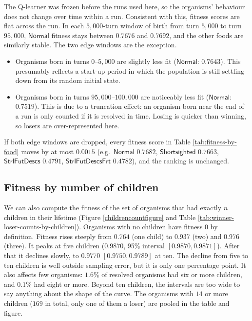 \documentclass{article}
\begin{document}
The Q-learner was frozen before the runs used here, so the organisms' behaviour
does not change over time within a run. Consistent with this, fitness scores are
flat across the run. In each $5{,}000$-turn window of birth from turn $5{,}000$ to
turn $95{,}000$, $\mathsf{Normal}$ fitness stays between $0.7676$ and $0.7692$,
and the other foods are similarly stable. The two edge windows are the
exception.
\begin{itemize}
    \item Organisms born in turns $0$--$5{,}000$ are slightly less fit
        ($\mathsf{Normal}$: $0.7643$). This presumably reflects a start-up period in
        which the population is still settling down from its random initial
        state.
    \item Organisms born in turns $95{,}000$--$100{,}000$ are noticeably less
        fit ($\mathsf{Normal}$: $0.7519$). This is due to a truncation effect:
        an organism born near the end of a run is only counted if it
        is resolved in time. Losing is quicker than winning, so losers are
        over-represented here.
\end{itemize}
If both edge windows are dropped, every fitness score in
Table \ref{tab:fitness-by-food} moves by at most $0.0015$
(e.g.\ $\mathsf{Normal}$ $0.7682$, $\mathsf{Shortsighted}$ $0.7663$,
$\mathsf{StrlFutDescs}$ $0.4791$, $\mathsf{StrlFutDescsFrt}$ $0.4782$), and the
ranking is unchanged.

\subsection{Fitness by number of children}

We can also compute the fitness of the set of organisms that had exactly $n$
children in their lifetime (Figure \ref{childrencountfigure} and
Table \ref{tab:winner-loser-counts-by-children}). Organisms with no children
have fitness $0$ by definition. Fitness rises steeply from $0.764$ (one child)
to $0.937$ (two) and $0.976$ (three). It peaks at five children ($0.9870$,
95\% interval $[0.9870, 0.9871]$). After that it declines slowly, to $0.9770$
$[0.9750, 0.9789]$ at ten. The decline from five to ten children is well
outside sampling error, but it is only one percentage point. It also affects
few organisms: $1.6\%$ of resolved organisms had six or more children, and
$0.1\%$ had eight or more. Beyond ten children, the intervals are too wide to
say anything about the shape of the curve. The organisms with $14$ or more
children ($169$ in total, only one of them a loser) are pooled in the table
and figure.
\end{document}
